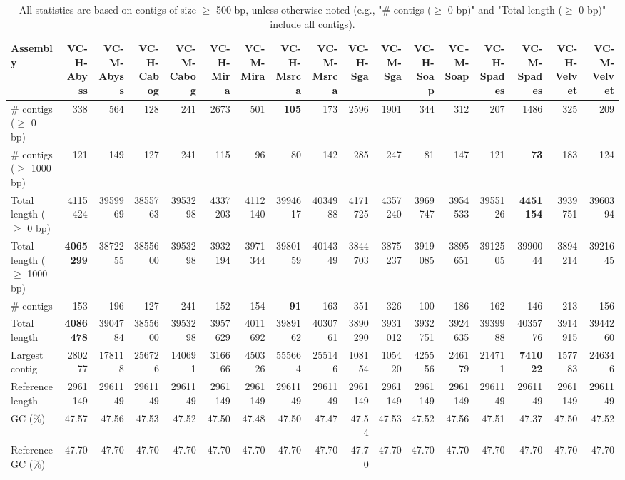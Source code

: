 \documentclass[12pt,a4paper]{article}
\begin{document}
\begin{table}[ht]
\begin{center}
\caption{All statistics are based on contigs of size $\geq$ 500 bp, unless otherwise noted (e.g., "\# contigs ($\geq$ 0 bp)" and "Total length ($\geq$ 0 bp)" include all contigs).}
\begin{tabular}{|l*{16}{|r}|}
\hline
Assembly & VC-H-Abyss & VC-M-Abyss & VC-H-Cabog & VC-M-Cabog & VC-H-Mira & VC-M-Mira & VC-H-Msrca & VC-M-Msrca & VC-H-Sga & VC-M-Sga & VC-H-Soap & VC-M-Soap & VC-H-Spades & VC-M-Spades & VC-H-Velvet & VC-M-Velvet \\ \hline
\# contigs ($\geq$ 0 bp) & 338 & 564 & 128 & 241 & 2673 & 501 & {\bf 105} & 173 & 2596 & 1901 & 344 & 312 & 207 & 1486 & 325 & 209 \\ \hline
\# contigs ($\geq$ 1000 bp) & 121 & 149 & 127 & 241 & 115 & 96 & 80 & 142 & 285 & 247 & 81 & 147 & 121 & {\bf 73} & 183 & 124 \\ \hline
Total length ($\geq$ 0 bp) & 4115424 & 3959969 & 3855763 & 3953298 & 4337203 & 4112140 & 3994617 & 4034988 & 4171725 & 4357240 & 3969747 & 3954533 & 3955126 & {\bf 4451154} & 3939751 & 3960394 \\ \hline
Total length ($\geq$ 1000 bp) & {\bf 4065299} & 3872255 & 3855600 & 3953298 & 3932194 & 3971344 & 3980159 & 4014349 & 3844703 & 3875237 & 3919085 & 3895651 & 3912505 & 3990044 & 3894214 & 3921645 \\ \hline
\# contigs & 153 & 196 & 127 & 241 & 152 & 154 & {\bf 91} & 163 & 351 & 326 & 100 & 186 & 162 & 146 & 213 & 156 \\ \hline
Total length & {\bf 4086478} & 3904784 & 3855600 & 3953298 & 3957629 & 4011692 & 3989162 & 4030761 & 3890290 & 3931012 & 3932751 & 3924635 & 3939988 & 4035776 & 3914915 & 3944260 \\ \hline
Largest contig & 280277 & 178118 & 256726 & 140691 & 316666 & 450326 & 555664 & 255146 & 108154 & 105420 & 425556 & 246179 & 214711 & {\bf 741022} & 157783 & 246346 \\ \hline
Reference length & 2961149 & 2961149 & 2961149 & 2961149 & 2961149 & 2961149 & 2961149 & 2961149 & 2961149 & 2961149 & 2961149 & 2961149 & 2961149 & 2961149 & 2961149 & 2961149 \\ \hline
GC (\%) & 47.57 & 47.56 & 47.53 & 47.52 & 47.50 & 47.48 & 47.50 & 47.47 & 47.54 & 47.53 & 47.52 & 47.56 & 47.51 & 47.37 & 47.50 & 47.52 \\ \hline
Reference GC (\%) & 47.70 & 47.70 & 47.70 & 47.70 & 47.70 & 47.70 & 47.70 & 47.70 & 47.70 & 47.70 & 47.70 & 47.70 & 47.70 & 47.70 & 47.70 & 47.70 \\ \hline

\end{tabular}
\end{center}
\end{table}
\end{document}
